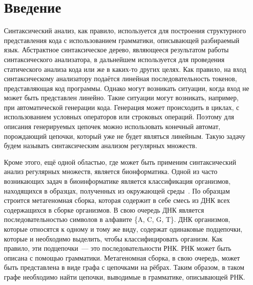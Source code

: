 \section*{Введение}

Синтаксический анализ, как правило, используется для построения структурного представления кода с использованием грамматики, описывающей разбираемый язык. Абстрактное синтаксическое дерево, являющееся результатом работы синтаксического анализатора, в дальнейшем используется для проведения статического анализа кода или же в каких-то других целях. Как правило, на вход синтаксическому анализатору подаётся линейная последовательность токенов, представляющая код программы. Однако могут возникать ситуации, когда вход не может быть представлен линейно. Такие ситуации могут возникать, например, при автоматической генерации кода. Генерация может происходить в циклах, с использованием условных операторов или строковых операций. Поэтому для описания генерируемых цепочек можно использовать конечный автомат, порождающий цепочки, который уже не будет являться линейным. Такую задачу будем называть синтаксическим анализом регулярных множеств.

Кроме этого, ещё одной областью, где может быть применим синтаксический анализ регулярных множеств, является бионформатика. Одной из часто возникающих задач в биоинформатике является классификация организмов, находящихся в образцах, полученных из окружающей среды~\cite{bioRNA}. По образцам строится метагеномная сборка, которая содержит в себе смесь из ДНК всех содержащихся в сборке организмов. В свою очередь ДНК является последовательностью символов в алфавите \{A, C, G, T\}. ДНК организмов, которые относятся к одному и тому же виду, содержат одинаковые подцепочки, которые и необходимо выделить, чтобы классифицировать организм. Как правило, эти подцепочки~--- это последовательности РНК. РНК может быть описана с помощью грамматики. Метагеномная сборка, в свою очередь, может быть представлена в виде графа с цепочками на рёбрах. Таким образом, в таком графе необходимо найти цепочки, выводимые в грамматике, описывающей РНК. 

